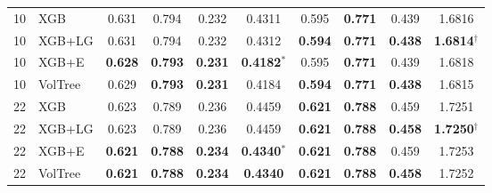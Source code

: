 \documentclass[runningheads]{llncs}
\begin{document}
\begin{table}[h!]
\begin{tabular}{ll cccc cccc}
\midrule
10 & XGB      & 0.631 & 0.794 & 0.232 & 0.4311 & 0.595 & \textbf{0.771} & 0.439 & 1.6816 \\
10 & XGB+LG   & 0.631 & 0.794 & 0.232 & 0.4312 & \textbf{0.594} & \textbf{0.771} & \textbf{0.438} & \textbf{1.6814$^{\dagger}$} \\
10 & XGB+E    & \textbf{0.628} & \textbf{0.793} & \textbf{0.231} & \textbf{0.4182$^{*}$} & 0.595 & \textbf{0.771} & 0.439 & 1.6818 \\
10 & VolTree  & 0.629 & \textbf{0.793} & \textbf{0.231} & 0.4184 & \textbf{0.594} & \textbf{0.771} & \textbf{0.438} & 1.6815 \\
\midrule
22 & XGB      & 0.623 & 0.789 & 0.236 & 0.4459 & \textbf{0.621} & \textbf{0.788} & 0.459 & 1.7251 \\
22 & XGB+LG   & 0.623 & 0.789 & 0.236 & 0.4459 & \textbf{0.621} & \textbf{0.788} & \textbf{0.458} & \textbf{1.7250$^{\dagger}$} \\
22 & XGB+E    & \textbf{0.621} & \textbf{0.788} & \textbf{0.234} & \textbf{0.4340$^{*}$} & \textbf{0.621} & \textbf{0.788} & 0.459 & 1.7253 \\
22 & VolTree  & \textbf{0.621} & \textbf{0.788} & \textbf{0.234} & \textbf{0.4340} & \textbf{0.621} & \textbf{0.788} & \textbf{0.458} & 1.7252 \\
\bottomrule
\end{tabular}
\end{table}

\FloatBarrier
\end{document}
